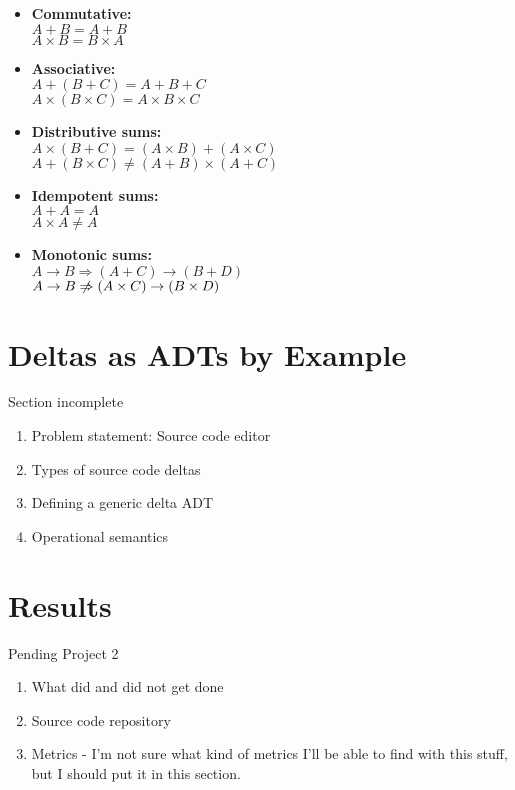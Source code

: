 \documentclass[12pt,a4paper]{article}
\begin{document}
		\begin{itemize}
			\item \textbf{Commutative:} 
			\\ $A + B = A + B$
			\\ $A \times B = B \times A $
			\item \textbf{Associative:} 
			\\ $A + (B + C) = A + B + C$
			\\ $A \times (B \times C) = A \times B \times C$
			\item \textbf{Distributive sums:} 
			\\ $ A \times (B + C) = (A \times B) + (A \times C)$
			\\ $ A + (B \times C) \neq (A + B) \times (A + C)$
			\item \textbf{Idempotent sums:}
			\\ $ A + A = A $
			\\ $ A \times A \neq A $
			\item \textbf{Monotonic sums:}
			\\ $ A \rightarrow B \Rightarrow (A + C) \rightarrow (B + D) $
			\\ $ A \rightarrow B \centernot\Rightarrow (A \times C) \rightarrow (B \times D) $
		\end{itemize}
	
	\section{Deltas as ADTs by Example}
		Section incomplete
		\begin{enumerate}
			\item Problem statement: Source code editor
			\item Types of source code deltas
			\item Defining a generic delta ADT
			\item Operational semantics
		\end{enumerate}
		
		
	\section{Results}
		Pending Project 2
				\begin{enumerate}
					\item What did and did not get done
					\item Source code repository
					\item Metrics - I'm not sure what kind of metrics I'll be able to find with this stuff, but I should put it in this section.
				\end{enumerate}
\end{document}
